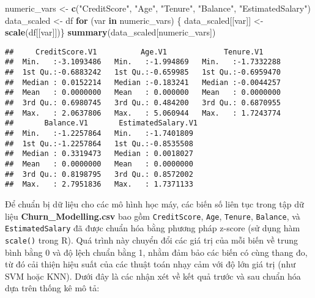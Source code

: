 \documentclass[
]{article}
\newenvironment{Shaded}{\begin{snugshade}}{\end{snugshade}}
\newcommand{\ControlFlowTok}[1]{\textcolor[rgb]{0.13,0.29,0.53}{\textbf{#1}}}
\newcommand{\FunctionTok}[1]{\textcolor[rgb]{0.13,0.29,0.53}{\textbf{#1}}}
\newcommand{\NormalTok}[1]{#1}
\newcommand{\OtherTok}[1]{\textcolor[rgb]{0.56,0.35,0.01}{#1}}
\newcommand{\StringTok}[1]{\textcolor[rgb]{0.31,0.60,0.02}{#1}}
\begin{document}
\begin{Shaded}
\begin{Highlighting}[]
\NormalTok{numeric\_vars }\OtherTok{\textless{}{-}} \FunctionTok{c}\NormalTok{(}\StringTok{"CreditScore"}\NormalTok{, }\StringTok{"Age"}\NormalTok{, }\StringTok{"Tenure"}\NormalTok{, }\StringTok{"Balance"}\NormalTok{, }\StringTok{"EstimatedSalary"}\NormalTok{)}
\NormalTok{data\_scaled }\OtherTok{\textless{}{-}}\NormalTok{ df}
\ControlFlowTok{for}\NormalTok{ (var }\ControlFlowTok{in}\NormalTok{ numeric\_vars) \{}
\NormalTok{  data\_scaled[[var]] }\OtherTok{\textless{}{-}} \FunctionTok{scale}\NormalTok{(df[[var]])\}}
\FunctionTok{summary}\NormalTok{(data\_scaled[numeric\_vars])}
\end{Highlighting}
\end{Shaded}

\begin{verbatim}
##     CreditScore.V1          Age.V1             Tenure.V1      
##  Min.   :-3.1093486   Min.   :-1.994869   Min.   :-1.7332288  
##  1st Qu.:-0.6883242   1st Qu.:-0.659985   1st Qu.:-0.6959470  
##  Median : 0.0152214   Median :-0.183241   Median :-0.0044257  
##  Mean   : 0.0000000   Mean   : 0.000000   Mean   : 0.0000000  
##  3rd Qu.: 0.6980745   3rd Qu.: 0.484200   3rd Qu.: 0.6870955  
##  Max.   : 2.0637806   Max.   : 5.060944   Max.   : 1.7243774  
##       Balance.V1       EstimatedSalary.V1 
##  Min.   :-1.2257864   Min.   :-1.7401809  
##  1st Qu.:-1.2257864   1st Qu.:-0.8535508  
##  Median : 0.3319473   Median : 0.0018027  
##  Mean   : 0.0000000   Mean   : 0.0000000  
##  3rd Qu.: 0.8198795   3rd Qu.: 0.8572002  
##  Max.   : 2.7951836   Max.   : 1.7371133
\end{verbatim}

Để chuẩn bị dữ liệu cho các mô hình học máy, các biến số liên tục trong
tập dữ liệu \textbf{Churn\_Modelling.csv} bao gồm \texttt{CreditScore},
\texttt{Age}, \texttt{Tenure}, \texttt{Balance}, và
\texttt{EstimatedSalary} đã được chuẩn hóa bằng phương pháp z-score (sử
dụng hàm \texttt{scale()} trong R). Quá trình này chuyển đổi các giá trị
của mỗi biến về trung bình bằng 0 và độ lệch chuẩn bằng 1, nhằm đảm bảo
các biến có cùng thang đo, từ đó cải thiện hiệu suất của các thuật toán
nhạy cảm với độ lớn giá trị (như SVM hoặc KNN). Dưới đây là các nhận xét
về kết quả trước và sau chuẩn hóa dựa trên thống kê mô tả:
\end{document}

